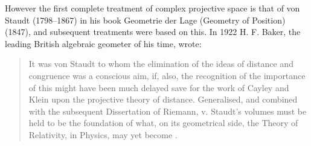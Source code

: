 However the first complete treatment of complex projective space is that of  von Staudt (1798--1867) in
his book Geometrie der Lage (Geometry of Position) (1847), and subsequent treatments were based on this. In 1922 H. F. Baker, the leading British algebraic geometer of his time, wrote: 
\begin{quotation}
 It was von Staudt to whom the elimination of the ideas of distance and congruence was a conscious aim, if, also, the recognition of the importance of this might have been much delayed save for the work of Cayley and Klein upon the projective theory of distance. Generalised, and combined with the subsequent Dissertation of Riemann, v. Staudt's volumes must be held to be the foundation of what, on its geometrical side, the Theory of Relativity, in Physics, may yet become \cite[p. 176]{MR2849917}.
\end{quotation}
